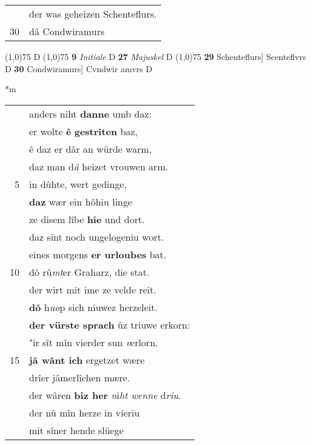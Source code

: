 \documentclass[8pt,a4paper,notitlepage]{article}
\begin{document}
\begin{table}[ht]
\begin{minipage}[t]{0.5\linewidth}
\begin{tabular}{rl}
 & der was geheizen Schenteflurs.\\ 
30 & dâ Condwiramurs\\ 
\end{tabular}
\scriptsize
\line(1,0){75} \newline
D \newline
\line(1,0){75} \newline
\textbf{9} \textit{Initiale} D  \textbf{27} \textit{Majuskel} D  \newline
\line(1,0){75} \newline
\textbf{29} Schenteflurs] Scenteflvrs D \textbf{30} Condwiramurs] Cvndwir amvrs D \newline
\end{minipage}
\hspace{0.5cm}
\begin{minipage}[t]{0.5\linewidth}
\small
\begin{center}*m
\end{center}
\begin{tabular}{rl}
 & anders niht \textbf{danne} umb daz:\\ 
 & er wolte \textbf{ê} \textbf{gestrîten} baz,\\ 
 & ê daz er dâr an würde warm,\\ 
 & daz man d\textit{â} heizet vrouwen arm.\\ 
5 & in dûhte, wert gedinge,\\ 
 & \textbf{daz} wær ein hôhiu linge\\ 
 & ze disem lîbe \textbf{hie} und dort.\\ 
 & daz sint noch ungelogeniu wort.\\ 
 & eines morgens \textbf{er urloubes} bat.\\ 
10 & dô rû\textit{mt}er Graharz, die stat.\\ 
 & der wirt mit ime ze velde reit.\\ 
 & \textbf{dô} h\textit{uo}p sich niuwez herzeleit.\\ 
 & \textbf{der vürste sprach} ûz triuwe erkorn:\\ 
 & "ir sît mîn vierder sun \textit{v}erlorn.\\ 
15 & \textbf{jâ wânt ich} ergetzet wære\\ 
 & drîer jâmerlîchen mære.\\ 
 & der wâren \textbf{biz her} \textit{n}i\textit{ht wenne} d\textit{riu}.\\ 
 & der nû mîn herze in vieriu\\ 
 & mit sîner hende slüege\\ 

\end{tabular}
\end{minipage}
\end{table}
\end{document}
